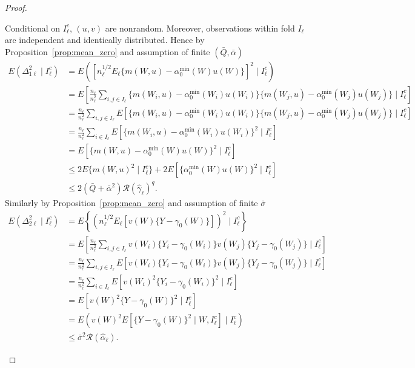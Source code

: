 \begin{proof}
\begin{enumerate}
    Conditional on $I_{\ell}^c$, $(u,v)$ are nonrandom. Moreover, observations within fold $I_{\ell}$ are independent and identically distributed. Hence by Proposition~\ref{prop:mean_zero} and assumption of finite $(\bar{Q},\bar{\alpha})$
    \begin{align*}
        E(\Delta^2_{1\ell}\mid I^c_{\ell})
        &=E \left([n_{\ell}^{1/2}E_{\ell}\{m(W,u)-\alpha_0^{\min}(W)u(W)\}]^2 \mid I^c_{\ell}\right) \\
        &=E \left[ \frac{n_{\ell}}{n^2_{\ell}} \sum_{i,j\in I_{\ell}} \{m(W_i,u)-\alpha_0^{\min}(W_i)u(W_i)\}\{m(W_j,u)-\alpha_0^{\min}(W_j)u(W_j)\} \mid I^c_{\ell}\right] \\
        &= \frac{n_{\ell}}{n^2_{\ell}} \sum_{i,j\in I_{\ell}}E \left[ \{m(W_i,u)-\alpha_0^{\min}(W_i)u(W_i)\}\{m(W_j,u)-\alpha_0^{\min}(W_j)u(W_j)\} \mid I^c_{\ell}\right] \\
        &= \frac{n_{\ell}}{n^2_{\ell}} \sum_{i\in I_{\ell}}E \left[ \{m(W_i,u)-\alpha_0^{\min}(W_i)u(W_i)\}^2 \mid I^c_{\ell}\right] \\
        &=E[\{m(W,u)-\alpha_0^{\min}(W)u(W)\}^2\mid I^c_{\ell}] \\
        &\leq 2 E\{m(W,u)^2\mid I^c_{\ell}\}+2E[\{\alpha_0^{\min}(W)u(W)\}^2\mid I^c_{\ell}] \\
        &\leq 2(\bar{Q}+\bar{\alpha}^2)\mathcal{R}(\hat{\gamma}_{\ell})^q.
    \end{align*}
    Similarly by Proposition~\ref{prop:mean_zero} and assumption of finite $\bar{\sigma}$
    \begin{align*}
        E(\Delta^2_{2\ell}\mid I^c_{\ell})
       &=E \left\{(n_{\ell}^{1/2}E_{\ell}[v(W)\{Y-\gamma_0(W)\}])^2 \mid I^c_{\ell}\right\} \\
        &=E \left[ \frac{n_{\ell}}{n^2_{\ell}} \sum_{i,j\in I_{\ell}} v(W_i)\{Y_i-\gamma_0(W_i)\} v(W_j)\{Y_j-\gamma_0(W_j)\} \mid I^c_{\ell}\right] \\
        &= \frac{n_{\ell}}{n^2_{\ell}} \sum_{i,j\in I_{\ell}}E \left[ v(W_i)\{Y_i-\gamma_0(W_i)\} v(W_j)\{Y_j-\gamma_0(W_j)\} \mid I^c_{\ell}\right] \\
        &= \frac{n_{\ell}}{n^2_{\ell}} \sum_{i\in I_{\ell}}E \left[ v(W_i)^2\{Y_i-\gamma_0(W_i)\}^2 \mid I^c_{\ell}\right] \\
        &=E[v(W)^2\{Y-\gamma_0(W)\}^2\mid I^c_{\ell}] \\
        &=E\left(v(W)^2 E[\{Y-\gamma_0(W)\}^2\mid W,I^c_{\ell}]\mid I^c_{\ell}\right) \\
        &\leq \bar{\sigma}^2 \mathcal{R}(\hat{\alpha}_{\ell}).

\end{align*}
\end{enumerate}
\end{proof}

